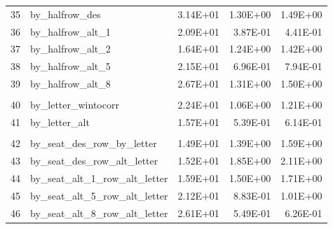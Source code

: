 \documentclass[11pt]{article}
\begin{document}
\begin{table}[htbp]
\begin{tabular}{rlrrr}
    \end{tabular}%

  \label{tab:fig1}%
\end{table}%
\begin{table}[t]
	\centering
	\begin{tabular}{rlrrr}
		 35    & by\_halfrow\_des & 3.14E+01 & 1.30E+00 & 1.49E+00 \\
		36    & by\_halfrow\_alt\_1 & 2.09E+01 & 3.87E-01 & 4.41E-01 \\
		37    & by\_halfrow\_alt\_2 & 1.64E+01 & 1.24E+00 & 1.42E+00 \\
		38    & by\_halfrow\_alt\_5 & 2.15E+01 & 6.96E-01 & 7.94E-01 \\
		39    & by\_halfrow\_alt\_8 & 2.67E+01 & 1.31E+00 & 1.50E+00 \\
		&       &       &       &  \\
		40    & by\_letter\_wintocorr & 2.24E+01 & 1.06E+00 & 1.21E+00 \\
		41    & by\_letter\_alt & 1.57E+01 & 5.39E-01 & 6.14E-01 \\
		&       &       &       &  \\
		42    & by\_seat\_des\_row\_by\_letter & 1.49E+01 & 1.39E+00 & 1.59E+00 \\
		43    & by\_seat\_des\_row\_alt\_letter & 1.52E+01 & 1.85E+00 & 2.11E+00 \\
		44    & by\_seat\_alt\_1\_row\_alt\_letter & 1.59E+01 & 1.50E+00 & 1.71E+00 \\
		45    & by\_seat\_alt\_5\_row\_alt\_letter & 2.12E+01 & 8.83E-01 & 1.01E+00 \\
		46    & by\_seat\_alt\_8\_row\_alt\_letter & 2.61E+01 & 5.49E-01 & 6.26E-01 \\
	\end{tabular}
\end{table}


		
\end{document}
